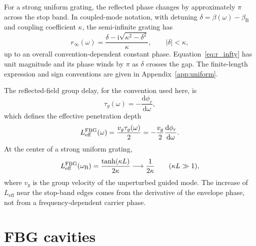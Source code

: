 \documentclass[aps,pra,twocolumn,superscriptaddress,nofootinbib]{revtex4-2}
\newcommand{\ii}{\mathrm{i}}
\newcommand{\eff}{\mathrm{eff}}
\newcommand{\B}{\mathrm{B}}
\newcommand{\dd}{\mathrm{d}}
\begin{document}
For a strong uniform grating, the reflected phase changes by approximately $\pi$ across the stop band.  In coupled-mode notation, with detuning $\delta=\beta(\omega)-\beta_\B$ and coupling coefficient $\kappa$, the semi-infinite grating has
\begin{equation}
    r_\infty(\omega)=\frac{\delta-\ii\sqrt{\kappa^2-\delta^2}}{\kappa},
    \qquad |\delta|<\kappa,
    \label{eq:r_infty}
\end{equation}
up to an overall convention-dependent constant phase.  Equation~\eqref{eq:r_infty} has unit magnitude and its phase winds by $\pi$ as $\delta$ crosses the gap.  The finite-length expression and sign conventions are given in Appendix~\ref{app:uniform}.

The reflected-field group delay, for the convention used here, is
\begin{equation}
    \tau_g(\omega)=-\frac{\dd\phi_r}{\dd\omega},
    \label{eq:tau_def}
\end{equation}
which defines the effective penetration depth
\begin{equation}
    L_\eff^{\rm FBG}(\omega)=\frac{v_g\tau_g(\omega)}{2}
    =-\frac{v_g}{2}\frac{\dd\phi_r}{\dd\omega}.
    \label{eq:Leff_def}
\end{equation}
At the center of a strong uniform grating,
\begin{equation}
    L_\eff^{\rm FBG}(\omega_\B)=\frac{\tanh(\kappa L)}{2\kappa}
    \longrightarrow \frac{1}{2\kappa}\qquad (\kappa L\gg 1),
    \label{eq:Leff_center}
\end{equation}
where $v_g$ is the group velocity of the unperturbed guided mode.  The increase of $L_\eff$ near the stop-band edges comes from the derivative of the envelope phase, not from a frequency-dependent carrier phase.

\section{FBG cavities}
\label{sec:cavity}
\end{document}
